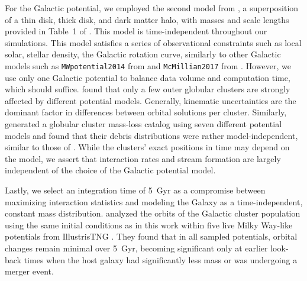         For the Galactic potential, we employed the second model from \citet{2017A&A...598A..66P}, a superposition of a thin disk, thick disk, and dark matter halo, with masses and scale lengths provided in Table~1 of \citet{2023A&A...673A..44F}. This model is time-independent throughout our simulations. This model satisfies a series of observational constraints such as local solar, stellar density, the Galactic rotation curve, similarly to other Galactic models such as \texttt{MWpotential2014} from \citet{2015ApJS..216...29B} and \texttt{McMillian2017} from \citet{2017MNRAS.465...76M}. However, we use only one Galactic potential to balance data volume and computation time, which should suffice. \citet{2021MNRAS.505.5978V} found that only a few outer globular clusters are strongly affected by different potential models. Generally, kinematic uncertainties are the dominant factor in differences between orbital solutions per cluster. Similarly, \citet{2024MNRAS.528.5189G} generated a globular cluster mass-loss catalog using seven different potential models and found that their debris distributions were rather model-independent, similar to those of \citet{2023A&A...673A..44F}. While the clusters' exact positions in time may depend on the model, we assert that interaction rates and stream formation are largely independent of the choice of the Galactic potential model.
    
        Lastly, we select an integration time of 5~Gyr as a compromise between maximizing interaction statistics and modeling the Galaxy as a time-independent, constant mass distribution. \citet{2023A&A...673A.152I} analyzed the orbits of the Galactic cluster population using the same initial conditions as in this work within five live Milky Way-like potentials from IllustrisTNG \citep{2018MNRAS.473.4077P}. They found that in all sampled potentials, orbital changes remain minimal over 5~Gyr, becoming significant only at earlier look-back times when the host galaxy had significantly less mass or was undergoing a merger event.


